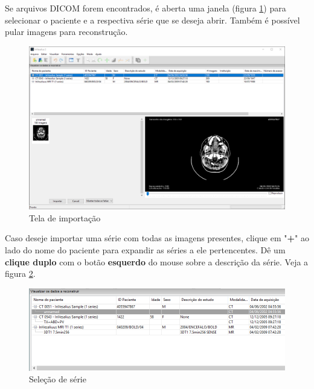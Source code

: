\newpage

Se arquivos DICOM forem encontrados, é aberta uma janela (figura \ref{fig:win_import})
para selecionar o paciente e a respectiva série que se deseja abrir. Também é possível
pular imagens para reconstrução.

\begin{figure}[!htb]
\centering
\includegraphics[scale=0.4]{../user_guide_figures/invesalius_screen/import_window_pt.png}
\caption{Tela de importação}
\label{fig:win_import}
\end{figure}

\newpage

Caso deseje importar uma série com todas as imagens presentes, clique em "\textbf{+}" ao
lado do nome do paciente para expandir as séries a ele pertencentes. Dê um \textbf{clique duplo}
com o botão \textbf{esquerdo} do mouse sobre a descrição da série. Veja a figura
\ref{fig:import_serie}.

\begin{figure}[!htb]
\centering
\includegraphics[scale=0.5]{../user_guide_figures/invesalius_screen/import_window_detail_pt.png}
\caption{Seleção de série}
\label{fig:import_serie}
\end{figure}
 

